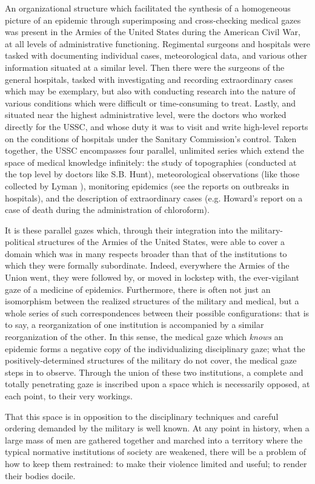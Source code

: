 \documentclass{report}
\begin{document}
  An organizational structure which facilitated the synthesis of a homogeneous picture of an epidemic through superimposing and cross-checking 
  medical gazes was present in the Armies of the United States during the American Civil War, at all levels of administrative functioning. Regimental
  surgeons and hospitals were tasked with documenting individual cases, meteorological data, and various other information situated at a similar
  level. Then there were the surgeons of the general hospitals, tasked with investigating and recording extraordinary cases which may be exemplary,
  but also with conducting research into the nature of various conditions which were difficult or time-consuming to treat. Lastly, and situated near
  the highest administrative level, were the doctors who worked directly for the USSC, and whose duty it was to visit and write high-level
  reports on the conditions of hospitals under the Sanitary Commission's control. Taken together, the USSC encompasses four parallel,
  unlimited series which extend the space of medical knowledge infinitely\autocite[pp.25]{Foucault1994}: the study of topographies 
  (conducted at the top level by doctors like S.B. Hunt\autocite{ussc:6:0990}), meteorological observations (like those collected by Lyman 
  \autocite{ussc:6:0112}), monitoring epidemics (see the reports on outbreaks in hospitals\autocite{ussc:9:1198}), and the description of extraordinary 
  cases (e.g. Howard's report on a case of death during the administration of chloroform\autocite{ussc:9:0388}).

  It is these parallel gazes which, through their integration into the military-political structures of the Armies of the United States, were able to cover
  a domain which was in many respects broader than that of the institutions to which they were formally subordinate. Indeed, everywhere the Armies
  of the Union went, they were followed by, or moved in lockstep with, the ever-vigilant gaze of a medicine of epidemics. Furthermore,
  there is often not just an isomorphism between the realized structures of the military and medical, but a whole series of such correspondences
  between their possible configurations: that is to say, a reorganization of one institution is accompanied by a similar reorganization of the
  other. In this sense, the medical gaze which \textit{knows} an epidemic forms a negative copy of the individualizing disciplinary gaze; what the
  positively-determined structures of the military do not cover, the medical gaze steps in to observe. Through the union of these two institutions,
  a complete and totally penetrating gaze is inscribed upon a space which is necessarily opposed, at each point, to their very workings.

  That this space is in opposition to the disciplinary techniques and careful ordering demanded by the military is well known. At any point
  in history, when a large mass of men are gathered together and marched into a territory where the typical normative institutions
  of society are weakened, there will be a problem of how to keep them restrained: to make their violence limited and useful; to render their
  bodies docile.

  \newpage
  \printbibliography
 
\end{document}
